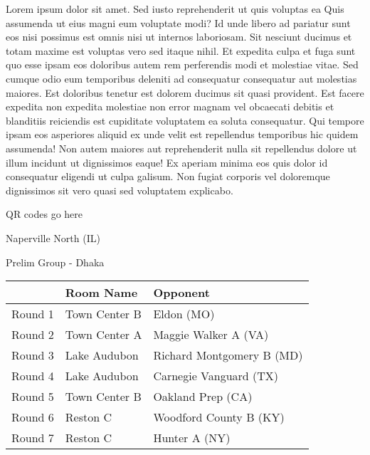 \documentclass{article}%
\begin{document}
\vspace*{8pt}%
\linebreak%
\newline%
\newline%
Lorem ipsum dolor sit amet. Sed iusto reprehenderit ut quis voluptas ea Quis assumenda ut eius magni eum voluptate modi? Id unde libero ad pariatur sunt eos nisi possimus est omnis nisi ut internos laboriosam. Sit nesciunt ducimus et totam maxime est voluptas vero sed itaque nihil. Et expedita culpa et fuga sunt quo esse ipsam eos doloribus autem rem perferendis modi et molestiae vitae.\newline%
\newline%
Sed cumque odio eum temporibus deleniti ad consequatur consequatur aut molestias maiores. Est doloribus tenetur est dolorem ducimus sit quasi provident. Est facere expedita non expedita molestiae non error magnam vel obcaecati debitis et blanditiis reiciendis est cupiditate voluptatem ea soluta consequatur. Qui tempore ipsam eos asperiores aliquid ex unde velit est repellendus temporibus hic quidem assumenda!\newline%
\newline%
Non autem maiores aut reprehenderit nulla sit repellendus dolore ut illum incidunt ut dignissimos eaque! Ex aperiam minima eos quis dolor id consequatur eligendi ut culpa galisum. Non fugiat corporis vel doloremque dignissimos sit vero quasi sed voluptatem explicabo.\newline%
\newline%
%
\vspace*{30pt}%
\begin{center}%
\begin{Huge}%
QR codes go here%
\end{Huge}%
\end{center}%
\newpage%
%
\begin{center}%
\begin{Huge}%
Naperville North (IL)%
\end{Huge}%
\vspace*{8pt}%
\linebreak%
\begin{Large}%
Prelim Group {-} Dhaka%
\end{Large}%
\end{center}%
\begin{tabularx}{\textwidth}{|c|Y|Y|}%
\hline%
&Room Name&Opponent\\%
\hline%
Round 1&Town Center B&Eldon (MO)\\%
Round 2&Town Center A&Maggie Walker A (VA)\\%
Round 3&Lake Audubon&Richard Montgomery B (MD)\\%
Round 4&Lake Audubon&Carnegie Vanguard (TX)\\%
Round 5&Town Center B&Oakland Prep (CA)\\%
Round 6&Reston C&Woodford County B (KY)\\%
Round 7&Reston C&Hunter A (NY)\\%
\hline%
\end{tabularx}%
\end{document}

